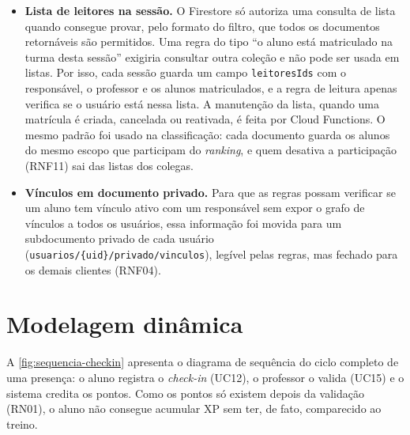 \begin{itemize}
  \item \textbf{Lista de leitores na sessão.} O Firestore só autoriza uma
        consulta de lista quando consegue provar, pelo formato do filtro,
        que todos os documentos retornáveis são permitidos. Uma regra do
        tipo ``o aluno está matriculado na turma desta sessão'' exigiria
        consultar outra coleção e não pode ser usada em listas. Por isso,
        cada sessão guarda um campo \texttt{leitoresIds} com o responsável,
        o professor e os alunos matriculados, e a regra de leitura apenas
        verifica se o usuário está nessa lista. A manutenção da lista,
        quando uma matrícula é criada, cancelada ou reativada, é feita por
        Cloud Functions. O mesmo padrão foi usado na classificação: cada
        documento guarda os alunos do mesmo escopo que participam do
        \textit{ranking}, e quem desativa a participação (RNF11) sai das
        listas dos colegas.
  \item \textbf{Vínculos em documento privado.} Para que as regras possam
        verificar se um aluno tem vínculo ativo com um responsável sem
        expor o grafo de vínculos a todos os usuários, essa informação foi
        movida para um subdocumento privado de cada usuário
        (\texttt{usuarios/\{uid\}/privado/vinculos}), legível pelas regras,
        mas fechado para os demais clientes (RNF04).
\end{itemize}

\section{Modelagem dinâmica}
\label{sec:modelagem-dinamica}

A \autoref{fig:sequencia-checkin} apresenta o diagrama de sequência do
ciclo completo de uma presença: o aluno registra o \textit{check-in}
(UC12), o professor o valida (UC15) e o sistema credita os pontos. Como
os pontos só existem depois da validação (RN01), o aluno não consegue
acumular XP sem ter, de fato, comparecido ao treino.

